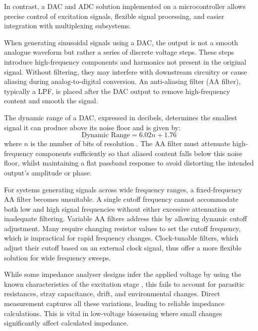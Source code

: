 In contrast, a \ac{DAC} and \ac{ADC} solution implemented on a microcontroller allows precise control of excitation signals, flexible signal processing, and easier integration with multiplexing subsystems. 

When generating sinusoidal signals using a \ac{DAC}, the output is not a smooth analogue waveform but rather a series of discrete voltage steps. These steps introduce high-frequency components and harmonics not present in the original signal. Without filtering, they may interfere with downstream circuitry or cause aliasing during analog-to-digital conversion. An anti-aliasing filter (AA filter), typically a \ac{LPF}, is placed after the \ac{DAC} output to remove high-frequency content and smooth the signal.

The dynamic range of a \ac{DAC}, expressed in decibels, determines the smallest signal it can produce above its noise floor and is given by:
\begin{equation}
    \text{Dynamic Range} = 6.02n + 1.76 
    \label{eq:dac_range_lit}
\end{equation}
where $n$ is the number of bits of resolution \cite{gaddyDYNAMICPERFORMANCETESTING}. The AA filter must attenuate high-frequency components sufficiently so that aliased content falls below this noise floor, whilst maintaining a flat passband response to avoid distorting the intended output's amplitude or phase.

For systems generating signals across wide frequency ranges, a fixed-frequency AA filter becomes unsuitable. A single cutoff frequency cannot accommodate both low and high signal frequencies without either excessive attenuation or inadequate filtering. Variable AA filters address this by allowing dynamic cutoff adjustment. Many require changing resistor values to set the cutoff frequency, which is impractical for rapid frequency changes. Clock-tunable filters, which adjust their cutoff based on an external clock signal, thus offer a more flexible solution for wide frequency sweeps.

While some impedance analyser designs infer the applied voltage by using the known characteristics of the excitation stage \cite{buscagliaSimpleZLowCostPortable2023}, this fails to account for parasitic resistances, stray capacitance, drift, and environmental changes. Direct measurement captures all these variations, leading to reliable impedance calculations. This is vital in low-voltage biosensing where small changes significantly affect calculated impedance.

